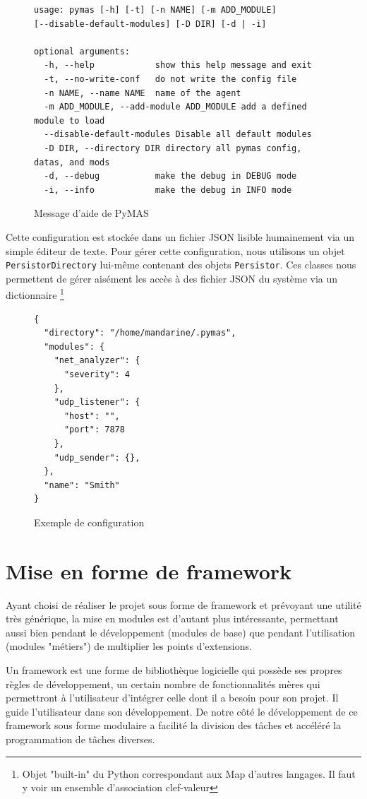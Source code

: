 \documentclass[11pt]{book}
\begin{document}
\begin{figure}[ht]
\begin{lstlisting}[style=msgTerminal]
usage: pymas [-h] [-t] [-n NAME] [-m ADD_MODULE] 
[--disable-default-modules] [-D DIR] [-d | -i]

optional arguments:
  -h, --help            show this help message and exit
  -t, --no-write-conf   do not write the config file
  -n NAME, --name NAME  name of the agent
  -m ADD_MODULE, --add-module ADD_MODULE add a defined module to load
  --disable-default-modules Disable all default modules
  -D DIR, --directory DIR directory all pymas config, datas, and mods
  -d, --debug           make the debug in DEBUG mode
  -i, --info            make the debug in INFO mode
\end{lstlisting}
\caption{Message d'aide de PyMAS}
\end{figure}
\clearpage

Cette configuration est stockée dans un fichier JSON lisible humainement
via un simple éditeur de texte. Pour gérer cette configuration, nous 
utilisons un objet \verb?PersistorDirectory? lui-même contenant des objets 
\verb?Persistor?. Ces classes nous permettent de gérer aisément les accès à 
des fichier JSON du système via un dictionnaire \footnote{Objet "built-in" du
Python correspondant aux Map d'autres langages. Il faut y voir un ensemble 
d'association clef-valeur}

\begin{figure}[ht]
\begin{lstlisting}[style=python]
{
  "directory": "/home/mandarine/.pymas", 
  "modules": {
    "net_analyzer": {
      "severity": 4
    }, 
    "udp_listener": {
      "host": "", 
      "port": 7878
    }, 
    "udp_sender": {}, 
  }, 
  "name": "Smith"
}
\end{lstlisting}
\caption{Exemple de configuration}
\end{figure}

\section{Mise en forme de framework}
Ayant choisi de réaliser le projet sous forme de framework et prévoyant une
utilité très générique, la mise en modules est d'autant plus intéressante, 
permettant aussi bien pendant le développement (modules de base) que pendant 
l'utilisation (modules "métiers") de multiplier les points d'extensions.

Un framework est une forme de bibliothèque logicielle qui possède ses 
propres règles de développement, un certain nombre de fonctionnalités mères 
qui permettront à l'utilisateur d'intégrer celle dont il a besoin pour 
son projet. Il guide l'utilisateur dans son développement. De notre côté 
le développement de ce framework sous forme modulaire a facilité la 
division des tâches et accéléré la programmation de tâches diverses.
\end{document}
